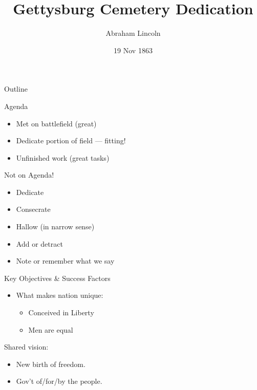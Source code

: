 \documentclass{beamer}
\title{Gettysburg Cemetery Dedication}
\author{Abraham Lincoln}
\institute{United States of America}
\date{19 Nov 1863}
\begin{document}
\begin{frame}
  \titlepage
\end{frame}

\begin{frame}{Outline}
  
\end{frame}

\begin{frame}{Agenda}
\begin{itemize}
    \item Met on battlefield (great)
    \item Dedicate portion of field --- fitting!
    \item Unfinished work (great tasks)
\end{itemize}
\end{frame}

\begin{frame}{Not on Agenda!}
\begin{itemize}
    \item Dedicate
    \pause \item Consecrate
    \pause \item Hallow (in narrow sense)
    \pause \item Add or detract
    \pause \item Note or remember what we say
\end{itemize}
\end{frame}

\begin{frame}{Key Objectives \& Success Factors}
\begin{itemize}
    \item What makes nation unique:
    \begin{itemize}
    \item Conceived in Liberty
    \item Men are equal
    \end{itemize}
\end{itemize}

\begin{block}{Shared vision:}
\begin{itemize}
  \item New birth of freedom.
  \item Gov't of/for/by the people.
\end{itemize}
\end{block}
\end{frame}
\end{document}
